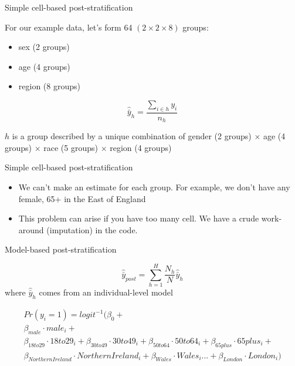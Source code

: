 \documentclass[aspectratio=169]{beamer}
\begin{document}
\begin{frame}{Simple cell-based post-stratification}

For our example data, let's form 64 $(2 \times 2 \times 8)$ groups:
\begin{itemize}
\item sex (2 groups)
\item age (4 groups)
\item region (8 groups)
\end{itemize}

\begin{equation*}
\hat{\bar{y}}_h = \frac{\sum_{i \in h} y_i}{n_h}
\end{equation*}

\vfill
$h$ is a group described by a unique combination of gender (2 groups) $\times$ age (4 groups) $\times$ race (5 groups) $\times$ region (4 groups) 

\end{frame}
\begin{frame}{Simple cell-based post-stratification}

\begin{itemize}
\item We can't make an estimate for each group. For example, we don't have any female, 65+ in the East of England \pause
\item This problem can arise if you have too many cell. We have a crude work-around (imputation) in the code. 
\end{itemize}

\end{frame}
\begin{frame}{Model-based post-stratification}

\begin{equation*}
\hat{\bar{y}}_{post} = \sum_{h=1}^H \frac{N_h}{N} \hat{\bar{y}}_h
\end{equation*}
where
$\hat{\bar{y}}_h$ comes from an individual-level model

\begin{align*}
Pr(y_i = 1) = logit^{-1} (\beta_0 + \\
\beta_{male} \cdot male_i+ \\
\beta_{18to29} \cdot 18to29_i +
\beta_{30to49} \cdot 30to49_i + \beta_{50to64} \cdot 50to64_i+ \beta_{65plus} \cdot 65plus_i +\\
\beta_{NorthernIreland} \cdot NorthernIreland_i + \beta_{Wales} \cdot Wales_i ... + \beta_{London} \cdot London_i)
\end{align*}

\end{frame}
\end{document}
